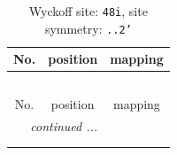\documentclass[fleqn,8pt]{jsarticle}
\begin{document}
\renewcommand{\arraystretch}{1.2}
\begin{longtable}{ccc}
\caption{Wyckoff site: {\tt 48i}, site symmetry: {\tt ..2'}}
 \\
 \hline \hline
No. & position & mapping \\ \hline \endfirsthead

\multicolumn{2}{l}{\tablename\ \thetable{}} \\
 \hline \hline
No. & position & mapping \\ \hline \endhead

 \hline \hline
\multicolumn{2}{r}{\footnotesize\it continued ...} \\ \endfoot

 \hline \hline
\multicolumn{2}{r}{} \\ \endlastfoot


\end{longtable}
\end{document}
